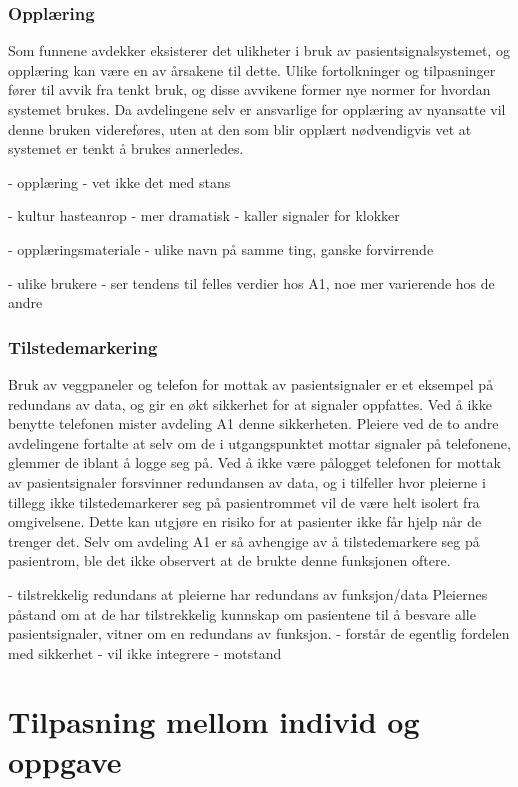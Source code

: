 \subsubsection{Opplæring}	 	
Som funnene avdekker eksisterer det ulikheter i bruk av pasientsignalsystemet, og opplæring kan være en av årsakene til dette. Ulike fortolkninger og tilpasninger fører til avvik fra tenkt bruk, og disse avvikene former nye normer for hvordan systemet brukes. Da avdelingene selv er ansvarlige for opplæring av nyansatte vil denne bruken videreføres, uten at den som blir opplært nødvendigvis vet at systemet er tenkt å brukes annerledes.



- opplæring 
	- vet ikke det med stans
	
- kultur hasteanrop
	- mer dramatisk
	- kaller signaler for klokker

- opplæringsmateriale - ulike navn på samme ting, ganske forvirrende

- ulike brukere
	- ser tendens til felles verdier hos A1, noe mer varierende hos de andre

\subsubsection{Tilstedemarkering}
Bruk av veggpaneler og telefon for mottak av pasientsignaler er et eksempel på redundans av data, og gir en økt sikkerhet for at signaler oppfattes. Ved å ikke benytte telefonen mister avdeling A1 denne sikkerheten. Pleiere ved de to andre avdelingene fortalte at selv om de i utgangspunktet mottar signaler på telefonene, glemmer de iblant å logge seg på. Ved å ikke være pålogget telefonen for mottak av pasientsignaler forsvinner redundansen av data, og i tilfeller hvor pleierne i tillegg ikke tilstedemarkerer seg på pasientrommet vil de være helt isolert fra omgivelsene. Dette kan utgjøre en risiko for at pasienter ikke får hjelp når de trenger det. Selv om avdeling A1 er så avhengige av å tilstedemarkere seg på pasientrom, ble det ikke observert at de brukte denne funksjonen oftere. 

- tilstrekkelig redundans at pleierne har redundans av funksjon/data
	Pleiernes påstand om at de har tilstrekkelig kunnskap om pasientene til å besvare alle pasientsignaler, vitner om en redundans av funksjon. 
- forstår de egentlig fordelen med sikkerhet
	- vil ikke integrere
	- motstand

\section{Tilpasning mellom individ og oppgave}


